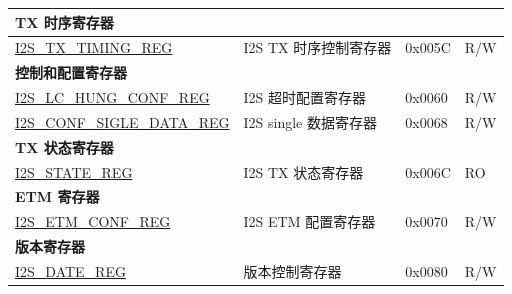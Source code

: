 \begin{longtable}{ | p{6cm} | p{6.2cm} | p{1.3cm} | p{2cm} | }
\multicolumn{4}{|l|}{\textbf{TX 时序寄存器}} \\ \hline
\hyperref[regdesc:I2STXTIMINGREG]{I2S\_TX\_TIMING\_REG} & I2S TX 时序控制寄存器 & 0x005C & R/W \\ \hline
\multicolumn{4}{|l|}{\textbf{控制和配置寄存器}} \\ \hline
\hyperref[regdesc:I2SLCHUNGCONFREG]{I2S\_LC\_HUNG\_CONF\_REG} & I2S 超时配置寄存器 & 0x0060 & R/W \\ \hline
\hyperref[regdesc:I2SCONFSIGLEDATAREG]{I2S\_CONF\_SIGLE\_DATA\_REG} & I2S single 数据寄存器 & 0x0068 & R/W \\ \hline
\multicolumn{4}{|l|}{\textbf{TX 状态寄存器}} \\ \hline
\hyperref[regdesc:I2SSTATEREG]{I2S\_STATE\_REG} & I2S TX 状态寄存器 & 0x006C & RO \\ \hline
\multicolumn{4}{|l|}{\textbf{ETM 寄存器}} \\ \hline
\hyperref[regdesc:I2SETMCONFREG]{I2S\_ETM\_CONF\_REG} & I2S ETM 配置寄存器 & 0x0070 & R/W \\ \hline
\multicolumn{4}{|l|}{\textbf{版本寄存器}} \\ \hline
\hyperref[regdesc:I2SDATEREG]{I2S\_DATE\_REG} & 版本控制寄存器 & 0x0080 & R/W \\ \hline
\end{longtable}
